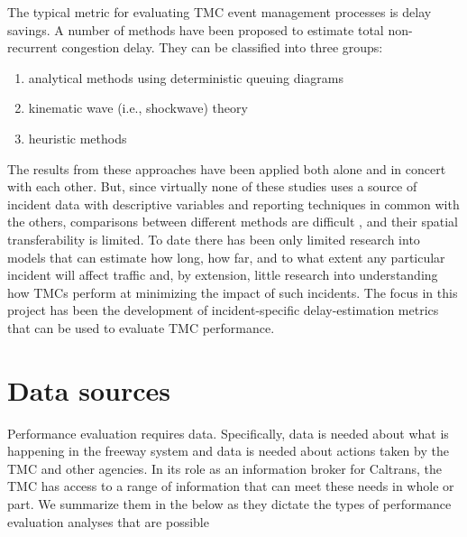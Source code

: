 \documentclass[12pt]{report}
\begin{document}
The typical metric for evaluating \ac{TMC} event management processes is
delay savings. A number of methods have been proposed to estimate
total non-recurrent congestion delay.  They can be classified into
three groups:
\begin{enumerate}
\item analytical methods using deterministic queuing diagrams
  \protect\citep[e.g.,]{goolsby71:_influen_of_incid_freew_qualit_of_servic,chow74:_study_of_traff_perfor_model,morales87:_analy_proced_for_estim_freew_traff_conges,trb94:_highw_capac_manual,lawson97:_using_input_output_diagr_to,erera98:_simpl_gener_method_for_analy,skabardonis04:_devel_and_applic_of_method}
\item kinematic wave (i.e., shockwave) theory \citep[e.g.,]{chow74:_study_of_traff_perfor_model,wirasinghe78:_deter_of_traff_delay_from,heydecker94:_incid_and_inter_freew,al-deek95:_new_method_for_estim_freew_incid_conges}
\item heuristic methods \citep[e.g.,]{skabardonis96:_i_field_exper,skabardonis03:_measur_recur_and_nonrec_traff_conges}
\end{enumerate}
The results from these approaches have been applied both alone and in concert
with each other. But, since virtually none of these studies uses a source of
incident data with descriptive variables and reporting techniques in common with
the others, comparisons between different methods are difficult
\citep{goolsby71:_influen_of_incid_freew_qualit_of_servic}, and their spatial
transferability is limited. To date there has been only limited research into
models that can estimate how long, how far, and to what extent any particular
incident will affect traffic and, by extension, little research into
understanding how \acp{TMC} perform at minimizing the impact of such incidents.
The focus in this project has been the development of incident-specific
delay-estimation metrics that can be used to evaluate \ac{TMC} performance.


\section{Data sources}
\label{sec:data-sources}

Performance evaluation requires data.  Specifically, data is needed
about what is happening in the freeway system and data is needed about
actions taken by the \ac{TMC} and other agencies.  In its role as an
information broker for Caltrans, the \ac{TMC} has access to a range of
information that can meet these needs in whole or part.  We summarize
them in the below as they dictate the types of performance evaluation
analyses that are possible
\end{document}
